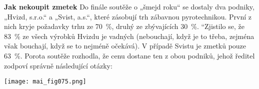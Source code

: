 \begin{mdframed}[style=mdexam]
  \begin{example}\label{mai:exam058}
    \textbf{Jak nekoupit zmetek}\newline
      Do finále soutěže o „šmejd roku“ se dostaly dva podniky, „Hvizd, s.r.o.“ a „Svist, a.s.“,
      které zásobují trh zábavnou pyrotechnikou. První z nich kryje požadavky trhu ze
      \SI{70}{\percent}, druhý ze zbývajících \SI{30}{\percent}. “Zjistilo se, že \SI{83}{\percent}
      ze všech výrobků Hvizdu je vadných (nebouchají, když je to třeba, zejména však bouchají, když
      se to nejméně očekává). V případě Svistu je zmetků pouze \SI{63}{\percent}. Porota soutěže
      rozhodla, že cenu dostane ten z obou podniků, jehož ředitel zodpoví správně následující
      otázky:

      {\centering
      \captionsetup{type=figure} 
      \texttt{[image: mai\_fig075.png]}
      \label{mai_fig075}
      \par}


\end{example}
\end{mdframed}
